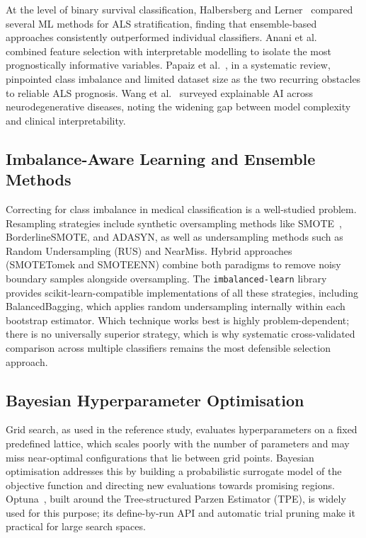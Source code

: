 \documentclass[preprint,12pt]{elsarticle}
\begin{document}
At the level of binary survival classification, Halbersberg and
Lerner~\cite{Halbersberg2023} compared several ML methods for ALS stratification,
finding that ensemble-based approaches consistently outperformed individual
classifiers. Anani et al.~\cite{Anani2023} combined feature selection with
interpretable modelling to isolate the most prognostically informative variables.
Papaiz et al.~\cite{Papaiz2022}, in a systematic review, pinpointed class
imbalance and limited dataset size as the two recurring obstacles to reliable ALS
prognosis. Wang et al.~\cite{Wang2025} surveyed explainable AI across
neurodegenerative diseases, noting the widening gap between model complexity and
clinical interpretability.

\subsection{Imbalance-Aware Learning and Ensemble Methods}

Correcting for class imbalance in medical classification is a well-studied problem. Resampling strategies include synthetic oversampling methods like
SMOTE~\cite{chawla2002smote}, BorderlineSMOTE, and ADASYN, as well as
undersampling methods such as Random Undersampling (RUS) and NearMiss. Hybrid
approaches (SMOTETomek and SMOTEENN) combine both paradigms to remove noisy
boundary samples alongside oversampling. The \texttt{imbalanced-learn}
library~\cite{lemaitre2017} provides scikit-learn-compatible implementations of
all these strategies, including BalancedBagging, which applies random
undersampling internally within each bootstrap estimator. Which technique works
best is highly problem-dependent; there is no universally superior strategy,
which is why systematic cross-validated comparison across multiple classifiers
remains the most defensible selection approach.

\subsection{Bayesian Hyperparameter Optimisation}

Grid search, as used in the reference study, evaluates hyperparameters on a fixed
predefined lattice, which scales poorly with the number of parameters and may
miss near-optimal configurations that lie between grid points. Bayesian
optimisation addresses this by building a probabilistic surrogate model of the
objective function and directing new evaluations towards promising regions.
Optuna~\cite{optuna2019}, built around the Tree-structured Parzen Estimator
(TPE), is widely used for this purpose; its define-by-run API and
automatic trial pruning make it practical for large search spaces.
\end{document}
